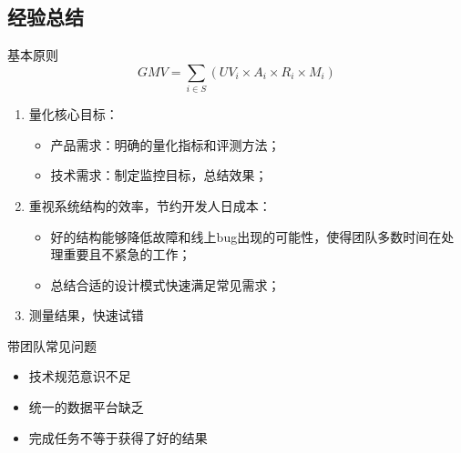 \documentclass{beamer}
\begin{document}
\begin{CJK}{UTF8}{gbsn}
\section{经验总结}


\begin{frame}{基本原则}
  $$ GMV = \sum_{i \in S}{(UV_i \times A_i \times R_i \times M_i)} $$
  \begin{enumerate}
  \item {
    量化核心目标：
    \begin{itemize}
    \item { 产品需求：明确的量化指标和评测方法； }
    \item { 技术需求：制定监控目标，总结效果； }
    \end{itemize}
  }
  \item {
    重视系统结构的效率，节约开发人日成本：
    \begin{itemize}
    \item { 好的结构能够降低故障和线上bug出现的可能性，使得团队多数时间在处理重要且不紧急的工作； }
    \item { 总结合适的设计模式快速满足常见需求； }
    \end{itemize}
  }
  \item {
    测量结果，快速试错
  }
  \end{enumerate}
\end{frame}

\begin{frame}{带团队常见问题}
  \begin{itemize}
    \item {技术规范意识不足}
    \item {统一的数据平台缺乏}
    \item {完成任务不等于获得了好的结果}
  \end{itemize}
\end{frame}

\end{CJK}
\end{document}

